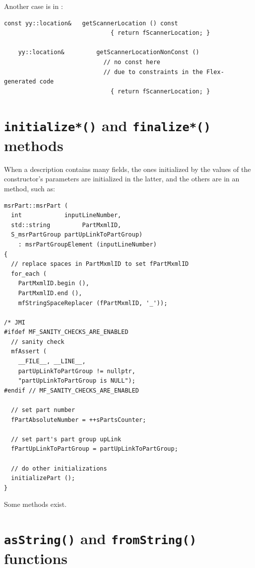 Another case is in :
\begin{lstlisting}[language=CPlusPlus]
    const yy::location&   getScannerLocation () const
                              { return fScannerLocation; }

    yy::location&         getScannerLocationNonConst ()
                            // no const here
                            // due to constraints in the Flex-generated code
                              { return fScannerLocation; }
\end{lstlisting}


\section{{\tt initialize*()} and {\tt finalize*()} methods}

When a description contains many fields, the ones initialized by the values of the constructor's parameters are initialized in the latter, and the others are in an  method, such as:
\begin{lstlisting}[language=CPlusPlus]
msrPart::msrPart (
  int            inputLineNumber,
  std::string         PartMxmlID,
  S_msrPartGroup partUpLinkToPartGroup)
    : msrPartGroupElement (inputLineNumber)
{
  // replace spaces in PartMxmlID to set fPartMxmlID
  for_each (
    PartMxmlID.begin (),
    PartMxmlID.end (),
    mfStringSpaceReplacer (fPartMxmlID, '_'));

/* JMI
#ifdef MF_SANITY_CHECKS_ARE_ENABLED
  // sanity check
  mfAssert (
    __FILE__, __LINE__,
    partUpLinkToPartGroup != nullptr,
    "partUpLinkToPartGroup is NULL");
#endif // MF_SANITY_CHECKS_ARE_ENABLED

  // set part number
  fPartAbsoluteNumber = ++sPartsCounter;

  // set part's part group upLink
  fPartUpLinkToPartGroup = partUpLinkToPartGroup;

  // do other initializations
  initializePart ();
}
\end{lstlisting}

Some  methods exist. %


\section{{\tt *asString()} and {\tt *fromString()} functions}

